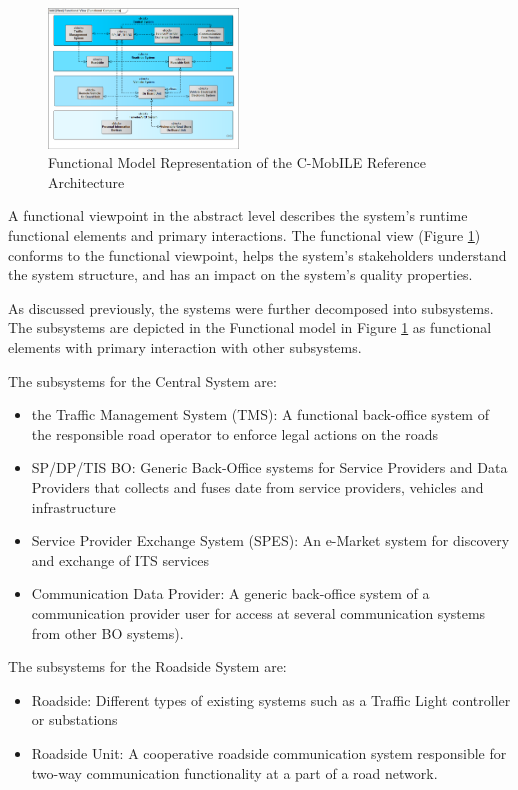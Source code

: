 \documentclass[conference]{IEEEtran}
\begin{document}
\begin{figure}[ht!]
	\centering
	\includegraphics[width=0.45\textwidth]{functional}
	\caption{Functional Model Representation of the C-MobILE Reference Architecture}
	\label{fig:functional}
	\centering
\end{figure}

A functional viewpoint in the abstract level describes the system's runtime functional elements and primary interactions\cite{sysml}. The functional view (Figure \ref{fig:functional}) conforms to the functional viewpoint, helps the system's stakeholders understand the system structure, and has an impact on the system's quality properties.

As discussed previously, the systems were further decomposed into subsystems. The subsystems are depicted in the Functional model in Figure \ref{fig:functional} as functional elements with primary interaction with other subsystems. 

The subsystems for the Central System are:

\begin{itemize}
	 \item the Traffic Management System (TMS):
	 A functional back-office system of the responsible road operator to enforce legal actions on the roads
	 \item SP/DP/TIS BO: 
	 Generic Back-Office systems for Service Providers and Data Providers that collects and fuses date from service providers, vehicles and infrastructure
	 \item Service Provider Exchange System (SPES): 
	 An e-Market system for discovery and exchange of ITS services
	 \item Communication Data Provider: 
	 A generic back-office system of a communication provider user for access at several communication systems from other BO systems).
\end{itemize}

The subsystems for the Roadside System are:
\begin{itemize}
	\item Roadside: Different types of existing systems such as a Traffic Light controller or substations
	\item Roadside Unit: A cooperative roadside communication system responsible for two-way communication functionality at a part of a road network.
\end{itemize} 
\end{document}
